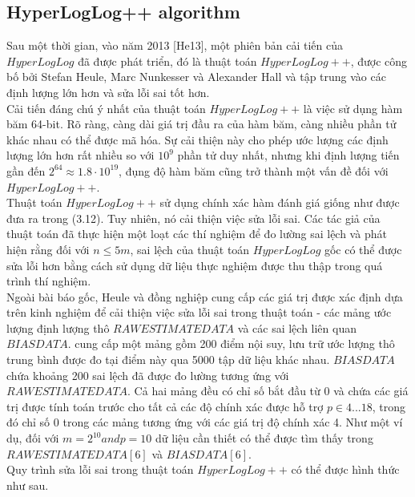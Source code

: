 \documentclass[a4paper,13pt]{article}
\theoremstyle{mytheor}
\begin{document}
\subsection*{HyperLogLog++ algorithm}
Sau một thời gian, vào năm 2013 [He13], một phiên bản cải tiến của $HyperLogLog$ đã được phát triển, 
đó là thuật toán $HyperLogLog++$, được công bố bởi Stefan Heule, Marc Nunkesser và Alexander Hall và tập trung vào 
các định lượng lớn hơn và sửa lỗi sai tốt hơn.\\
\indent Cải tiến đáng chú ý nhất của thuật toán $HyperLogLog++$ là việc sử dụng hàm băm 64-bit. Rõ ràng, 
càng dài giá trị đầu ra của hàm băm, càng nhiều phần tử khác nhau có thể được mã hóa. Sự cải thiện này cho phép ước lượng 
các định lượng lớn hơn rất nhiều so với $10^9$ phần tử duy nhất, nhưng khi định lượng tiến gần đến $2^64 \approx 1.8\cdot 10^{19}$, 
đụng độ hàm băm cũng trở thành một vấn đề đối với $HyperLogLog++$.\\
\indent Thuật toán $HyperLogLog++$ sử dụng chính xác hàm đánh giá giống như được đưa ra trong (3.12). Tuy nhiên, nó cải thiện việc sửa lỗi sai. 
Các tác giả của thuật toán đã thực hiện một loạt các thí nghiệm để đo lường sai lệch và phát hiện rằng đối với $n \le 5m$, 
sai lệch của thuật toán $HyperLogLog$ gốc có thể được sửa lỗi hơn bằng cách sử dụng dữ liệu thực nghiệm được thu thập trong quá trình thí nghiệm.\\
\indent Ngoài bài báo gốc, Heule và đồng nghiệp cung cấp các giá trị được xác định dựa trên kinh nghiệm 
để cải thiện việc sửa lỗi sai trong thuật toán - các mảng ước lượng định lượng thô $RAWESTIMATEDATA$ và 
các sai lệch liên quan $BIASDATA$. cung cấp một mảng gồm 200 điểm nội suy, lưu trữ ước lượng thô trung bình được đo tại điểm này 
qua 5000 tập dữ liệu khác nhau. $BIASDATA$ chứa khoảng 200 sai lệch đã được đo lường tương ứng với $RAWESTIMATEDATA$. 
Cả hai mảng đều có chỉ số bắt đầu từ 0 và chứa các giá trị được tính toán trước cho tất cả các độ chính xác được hỗ trợ $p \in 4...18$,
trong đó chỉ số 0 trong các mảng tương ứng với các giá trị độ chính xác 4. Như một ví dụ, đối với $m = 2^{10} and p = 10$ 
dữ liệu cần thiết có thể được tìm thấy trong $RAWESTIMATEDATA[6]$ và $BIASDATA[6]$.\\
\indent Quy trình sửa lỗi sai trong thuật toán $HyperLogLog++$ có thể được hình thức như sau.\\
\end{document}
